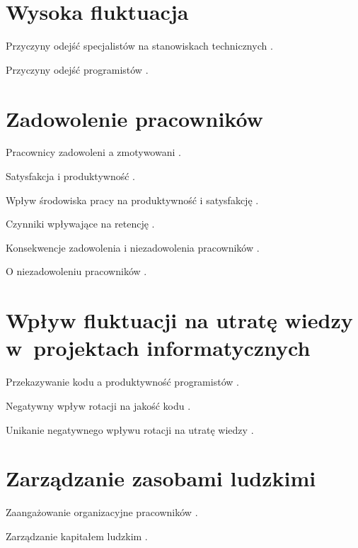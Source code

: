 \section{Wysoka fluktuacja}\label{sec:it-turnover}

Przyczyny odejść specjalistów na stanowiskach technicznych \cite{kapor-2017}.

Przyczyny odejść programistów \cite{hannon-2008}.


\section{Zadowolenie pracowników}\label{sec:it-motivation}
Pracownicy zadowoleni a zmotywowani \cite{sharp-2014}.

Satysfakcja i produktywność \cite{storey-2021}.

Wpływ środowiska pracy na produktywność i satysfakcję \cite{johnson-2021}.

Czynniki wpływające na retencję \cite{bass-2018}.

Konsekwencje zadowolenia i niezadowolenia pracowników \cite{graziotin-2018}.

O niezadowoleniu pracowników \cite{graziotin-2017}.



\section{Wpływ fluktuacji na utratę wiedzy w~projektach informatycznych}\label{sec:it-knowledge-loss}

Przekazywanie kodu a produktywność programistów \cite{mockus-2009}.

Negatywny wpływ rotacji na jakość kodu \cite{donadelli-2015}.

Unikanie negatywnego wpływu rotacji na utratę wiedzy \cite{rigby-2016}.


\section{Zarządzanie zasobami ludzkimi}\label{sec:it-project-management}

Zaangażowanie organizacyjne pracowników \cite{rosinski-2012}.

Zarządzanie kapitałem ludzkim \cite{brylka-2019}.

\thispagestyle{normal}
